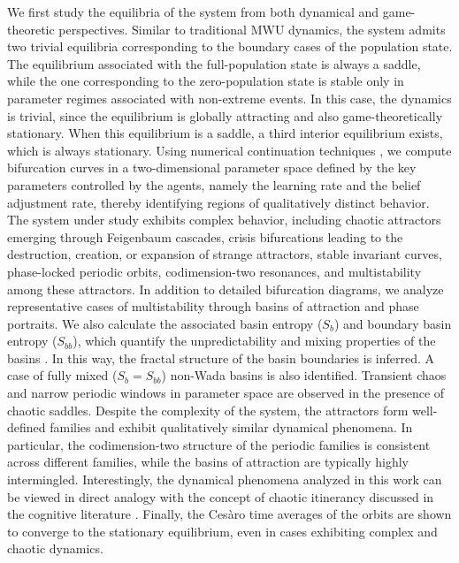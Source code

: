 \documentclass{article}
\theoremstyle{plain}
\theoremstyle{definition}
\begin{document}
We first study the equilibria of the system from both dynamical and game-theoretic perspectives. Similar to traditional MWU dynamics, the system admits two trivial equilibria corresponding to the boundary cases of the population state. The equilibrium associated with the full-population state is always a saddle, while the one corresponding to the zero-population state is stable only in parameter regimes associated with non-extreme events. In this case, the dynamics is trivial, since the equilibrium is globally attracting and also game-theoretically stationary. When this equilibrium is a saddle, a third interior equilibrium exists, which is always stationary. Using numerical continuation techniques \cite{matcont,datseris}, we compute bifurcation curves in a two-dimensional parameter space defined by the key parameters controlled by the agents, namely the learning rate and the belief adjustment rate, thereby identifying regions of qualitatively distinct behavior.
The system under study exhibits complex behavior, including chaotic attractors emerging through Feigenbaum cascades, crisis bifurcations \cite{crisis,crisis2,crisis3,lichtenberg1} leading to the destruction, creation, or expansion of strange attractors, stable invariant curves, phase-locked periodic orbits, codimension-two resonances, and multistability among these attractors. In addition to detailed bifurcation diagrams, we analyze representative cases of multistability through basins of attraction and phase portraits. We also calculate the associated basin entropy ($S_b$) and boundary basin entropy ($S_{bb}$), which quantify the unpredictability and mixing properties of the basins \cite{entropy1,entropy2,entropy3}. In this way, the fractal structure of the basin boundaries is inferred. A case of fully mixed ($S_b=S_{bb}$) non-Wada basins is also identified. Transient chaos and narrow periodic windows in parameter space are observed in the presence of chaotic saddles. Despite the complexity of the system, the attractors form well-defined families and exhibit qualitatively similar dynamical phenomena. In particular, the codimension-two structure of the periodic families is consistent across different families, while the basins of attraction are typically highly intermingled. Interestingly, the dynamical phenomena analyzed in this work can be viewed in direct analogy with the concept of chaotic itinerancy discussed in the cognitive literature \cite{kaneko,nicolis,tsuda,basios}. Finally, the Cesàro time averages of the orbits are shown to converge to the stationary equilibrium, even in cases exhibiting complex and chaotic dynamics. 
\end{document}
